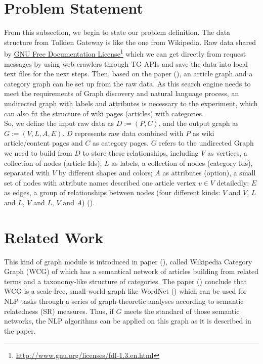 \section{Problem Statement}
\label{Ch-2:Sec:Problem Statement}
From this subsection, we begin to state our problem definition. The data structure from Tolkien Gateway is like the one from Wikipedia. Raw data shared by \href{http://www.gnu.org/licenses/fdl-1.3.en.html}{GNU Free Documentation License}\footnote{\href{http://www.gnu.org/licenses/fdl-1.3.en.html}{http://www.gnu.org/licenses/fdl-1.3.en.html}} which we can get directly from request messages by using web crawlers through TG APIs and save the data into local text files for the next steps. Then, based on the paper (\cite{zesch2007analysis}), an article graph and a category graph can be set up from the raw data. 
As this search engine needs to meet the requirements of Graph discovery and natural language process, an undirected graph with labels and attributes is necessary to the experiment, which can also fit the structure of wiki pages (articles) with categories. \\
So, we define the input raw data as $D := (P, C)$, and the output graph as $G := (V, L, A, E)$. $D$ represents raw data combined with $P$ as wiki article/content pages and $C$ as category pages. $G$ refers to the undirected Graph we need to build from $D$ to store these relationships, including $V$ as vertices, a collection of nodes (article Ids); $L$ as labels, a collection of nodes (category Ids), separated with $V$ by different shapes and colors; $A$ as attributes (option), a small set of nodes with attribute names described one article vertex $v \in V$ detailedly; $E$ as edges, a group of relationships between nodes (four different kinds: $V$ and $V$, $L$ and $L$, $V$ and $L$, $V$ and $A$) (\cite{newman2003structure}). 

\section{Related Work}
\label{Ch-2:Sec:Related Work}
This kind of graph module is introduced in paper (\cite{zesch2007analysis}), called Wikipedia Category Graph (WCG) of which has a semantical network of articles building from related terms and a taxonomy-like structure of categories. The paper (\cite{zesch2007analysis}) conclude that WCG is a scale-free, small-world graph like WordNet (\cite{miller1998wordnet}) which can be used for NLP tasks through a series of graph-theoretic analyses according to semantic relatedness (SR) measures. Thus, if $G$ meets the standard of those semantic networks, the NLP algorithms can be applied on this graph as it is described in the paper.

